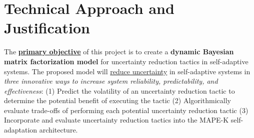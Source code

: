 \documentclass[12pt]{article}
\begin{document}
\cfoot{\thepage}
\setcounter{tocdepth}{1} %

\cfoot{} %




\renewcommand\contentsname{Table of Contents}



\tableofcontents
\listoffigures
\listoftables
\newpage

\setcounter{page}{1}


\section{Technical Approach and Justification}



The \underline{\bf primary objective} of this project is to create a {\bf dynamic Bayesian matrix factorization model} for uncertainty reduction tactics in self-adaptive systems. The proposed model will \ul{reduce uncertainty} in self-adaptive systems in \emph{three innovative ways to increase system reliability, predictability, and effectiveness}: (1) Predict the volatility of an uncertainty reduction tactic to determine the potential benefit of executing the tactic (2) Algorithmically evaluate trade-offs of performing each potential uncertainty reduction tactic (3) Incorporate and evaluate uncertainty reduction tactics into the MAPE-K self-adaptation architecture.
\end{document}
